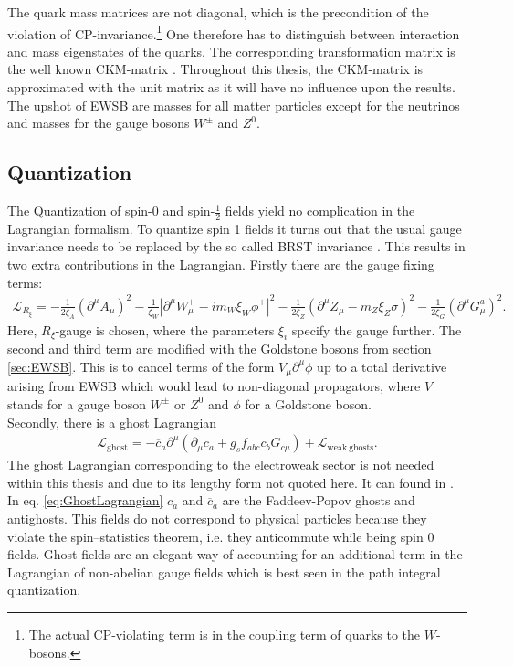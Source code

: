 The quark mass matrices are not diagonal, which is the precondition of the violation of CP-invariance.\footnote{The actual CP-violating term is in the coupling term of quarks to the $W$-bosons.} One therefore has to distinguish between interaction and mass eigenstates of the quarks. The corresponding transformation matrix is the well known CKM-matrix \cite{Cabbibo:1964zsa, Kobayashi:1973fv}. Throughout this thesis, the CKM-matrix is approximated with the unit matrix as it will have no influence upon the results.\\
The upshot of EWSB are masses for all matter particles except for the neutrinos and masses for the gauge bosons $W^\pm$ and $Z^0$.

\subsection{Quantization}
The Quantization of spin-0 and spin-$\frac{1}{2}$ fields yield no complication in the Lagrangian formalism. To quantize spin 1 fields it turns out that the usual gauge invariance needs to be replaced by the so called BRST invariance \cite{Becchi:1974xu, Becchi:1974md, Becchi:1975nq}. This results in two extra contributions in the Lagrangian. Firstly there are the gauge fixing terms:
\begin{align}
\mathcal{L}_{R_\xi} = -\frac{1}{2\xi_A} (\partial^\mu A_\mu)^2  - \frac{1}{\xi_W} |\partial^\mu W_\mu^+ - im_W \xi_W \phi^+|^2 - \frac{1}{2\xi_Z} (\partial^\mu Z_\mu - m_Z \xi_Z \sigma)^2 - \frac{1}{2\xi_G}(\partial^\mu G_\mu^a)^2.
\end{align}
Here, $R_\xi$-gauge is chosen, where the parameters $\xi_i$ specify the gauge further. The second and third term are modified with the Goldstone bosons from section \ref{sec:EWSB}. This is to cancel terms of the form $V_\mu \partial^\mu \phi$ up to a total derivative arising from EWSB which would lead to non-diagonal propagators, where $V$ stands for a gauge boson $W^\pm$ or $Z^0$ and $\phi$ for a Goldstone boson.\\%
Secondly, there is a ghost Lagrangian
\begin{align}
\mathcal{L}_{\mathrm{ghost}} = -\overline{c}_a \partial^\mu \left( \partial_\mu c_a + g_s f_{abc} c_b G_{c \mu} \right) + \mathcal{L}_{\mathrm{weak\ ghosts}}.\label{eq:GhostLagrangian}
\end{align}
The ghost Lagrangian corresponding to the electroweak sector is not needed within this thesis and due to its lengthy form not quoted here. It can found in \cite{book:811554}. %
In eq. \eqref{eq:GhostLagrangian} $c_a$ and $\overline{c}_a$ are the Faddeev-Popov ghosts and antighosts. This fields do not correspond to physical particles because they violate the spin–statistics theorem, i.e. they anticommute while being spin 0 fields. Ghost fields are an elegant way of accounting for an additional term in the Lagrangian of non-abelian gauge fields which is best seen in the path integral quantization\cite{Peskin}.

